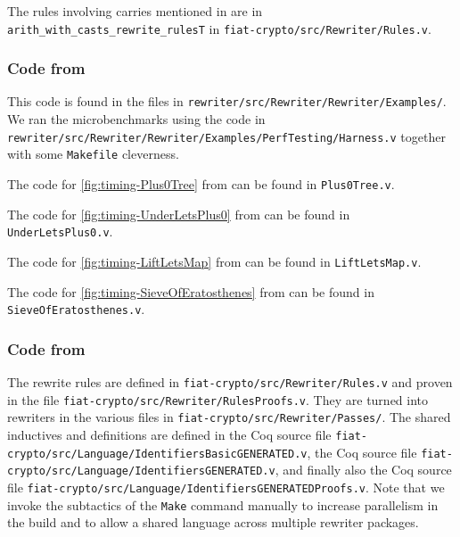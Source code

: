 \documentclass[a4paper,USenglish,cleveref,autoref,thm-restate]{lipics-v2021}
\begin{document}
\begin{minipage}[t][1cm]{\textwidth}
The rules involving carries mentioned in
 are in \texttt{arith_with_casts_rewrite_rulesT} in \texttt{fiat-crypto/src/Rewriter/Rules.v}.

\subsubsection{Code from }

This code is found in the files in \texttt{rewriter/src/Rewriter/Rewriter/Examples/}.
We ran the microbenchmarks using the code in \texttt{rewriter/src/Rewriter/Rewriter/Examples/PerfTesting/Harness.v} together with some \texttt{Makefile} cleverness.

The code for \autoref{fig:timing-Plus0Tree} from  can be found in \texttt{Plus0Tree.v}.

The code for \autoref{fig:timing-UnderLetsPlus0} from  can be found in \texttt{UnderLetsPlus0.v}.


The code for \autoref{fig:timing-LiftLetsMap} from  can be found in \texttt{LiftLetsMap.v}.

The code for \autoref{fig:timing-SieveOfEratosthenes} from  can be found in \texttt{SieveOfEratosthenes.v}.

\subsubsection{Code from }

The rewrite rules are defined in \texttt{fiat-crypto/src/Rewriter/Rules.v} and proven in the file \texttt{fiat-crypto/src/Rewriter/RulesProofs.v}.
They are turned into rewriters in the various files in \texttt{fiat-crypto/src/Rewriter/Passes/}.
The shared inductives and definitions are defined in the Coq source file \texttt{fiat-crypto/src/Language/IdentifiersBasicGENERATED.v}, the Coq source file \texttt{fiat-crypto/src/Language/IdentifiersGENERATED.v}, and finally also the Coq source file \texttt{fiat-crypto/src/Language/IdentifiersGENERATEDProofs.v}.
Note that we invoke the subtactics of the \texttt{Make} command manually to increase parallelism in the build and to allow a shared language across multiple rewriter packages.


\end{minipage}
\end{document}
